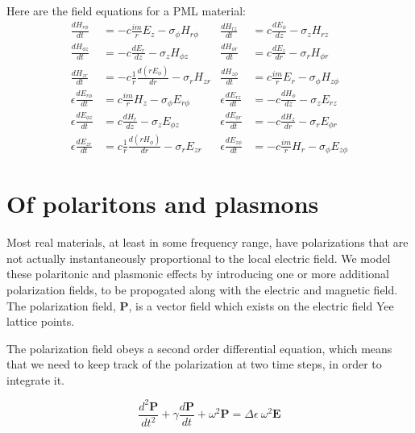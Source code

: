 \documentclass[floats]{book}
\begin{document}
Here are the field equations for a PML material:
\begin{align}
\frac{dH_{r\phi}}{dt} &= - c \frac{im}r E_z             - \sigma_\phi H_{r\phi} &
\frac{dH_{rz}}{dt} &= c \frac{dE_\phi}{dz}              - \sigma_z H_{rz}\\
\frac{dH_{\phi z}}{dt} &= - c \frac{dE_r}{dz}           - \sigma_z H_{\phi z} &
\frac{dH_{\phi r}}{dt} &= c \frac{dE_z}{dr}             - \sigma_r H_{\phi r} \\
\frac{dH_{zr}}{dt} &= - c \frac1r\frac{d(rE_\phi)}{dr}  - \sigma_r H_{zr}  &
\frac{dH_{z\phi}}{dt} &= c \frac{im}r E_r               - \sigma_\phi H_{z\phi} \\
\epsilon\frac{dE_{r\phi}}{dt} &=   c \frac{im}r H_z             - \sigma_\phi E_{r\phi} &
\epsilon\frac{dE_{rz}}{dt} &= -c\frac{dH_\phi}{dz}              - \sigma_z E_{rz}\\
\epsilon\frac{dE_{\phi z}}{dt} &=   c \frac{dH_r}{dz}           - \sigma_z E_{\phi z} &
\epsilon\frac{dE_{\phi r}}{dt} &=-c \frac{dH_z}{dr}             - \sigma_r E_{\phi r} \\
\epsilon\frac{dE_{zr}}{dt} &=   c \frac1r\frac{d(rH_\phi)}{dr}  - \sigma_r E_{zr}  &
\epsilon\frac{dE_{z\phi}}{dt} &=-c \frac{im}r H_r               - \sigma_\phi E_{z\phi} 
\end{align}

\chapter{Of polaritons and plasmons}\label{polaritons}

Most real materials, at least in some frequency range, have polarizations
that are not actually instantaneously proportional to the local electric
field.  We model these polaritonic and plasmonic effects by introducing one
or more additional polarization fields, to be propogated along with the
electric and magnetic field.  The polarization field, $\mathbf{P}$, is a
vector field which exists on the electric field Yee lattice points.

The polarization field obeys a second order differential equation, which
means that we need to keep track of the polarization at two time steps, in
order to integrate it.

\begin{equation}
\frac{d^2\mathbf{P}}{dt^2} + \gamma \frac{d\mathbf{P}}{dt}
+ \omega^2 \mathbf{P} = \Delta\epsilon\ \omega^2 \mathbf{E}
\end{equation}
\end{document}
